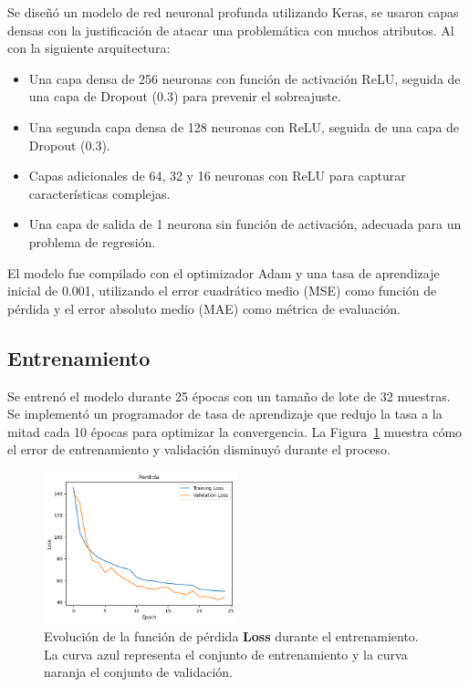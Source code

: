 \documentclass[conference]{IEEEtran} %
\begin{document}
Se diseñó un modelo de red neuronal profunda utilizando Keras, se usaron 
capas densas con la justificación de atacar una problemática con muchos 
atributos. Al con 
la siguiente arquitectura:
\begin{itemize}
    \item Una capa densa de 256 neuronas con función de activación ReLU, 
    seguida de una capa de Dropout (0.3) para prevenir el sobreajuste.
    \item Una segunda capa densa de 128 neuronas con ReLU, seguida de una 
    capa de Dropout (0.3).
    \item Capas adicionales de 64, 32 y 16 neuronas con ReLU para capturar
    características complejas.
    \item Una capa de salida de 1 neurona sin función de activación, adecuada 
    para un problema de regresión.
\end{itemize}

El modelo fue compilado con el optimizador Adam y una tasa de 
aprendizaje inicial de 0.001, utilizando el error cuadrático medio 
(MSE) como función de pérdida y el error absoluto medio (MAE) como 
métrica de evaluación.

\subsection{Entrenamiento}

Se entrenó el modelo durante 25 épocas con un tamaño de lote de 
32 muestras. Se implementó un programador de tasa de aprendizaje 
que redujo la tasa a la mitad cada 10 épocas para optimizar la 
convergencia. La Figura~\ref{fig:loss} muestra cómo el 
error de entrenamiento y validación disminuyó durante el proceso.

\begin{figure}[!h]
    \centering
    \includegraphics[width=0.5\textwidth]{Loss.png} %
    \caption{Evolución de la función de pérdida {\bf Loss} durante el entrenamiento. La curva azul representa el conjunto de entrenamiento y la curva naranja el conjunto de validación.}
    \label{fig:loss}
\end{figure}
\end{document}
